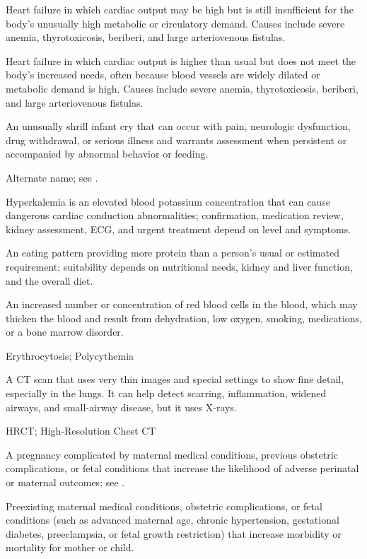  Heart failure in which cardiac output may be high but is still insufficient for the body's unusually high metabolic or circulatory demand. Causes include severe anemia, thyrotoxicosis, beriberi, and large arteriovenous fistulas.

 Heart failure in which cardiac output is higher than usual but does not meet the body's increased needs, often because blood vessels are widely dilated or metabolic demand is high. Causes include severe anemia, thyrotoxicosis, beriberi, and large arteriovenous fistulas.

 An unusually shrill infant cry that can occur with pain, neurologic dysfunction, drug withdrawal, or serious illness and warrants assessment when persistent or accompanied by abnormal behavior or feeding.

 Alternate name; see .

 Hyperkalemia is an elevated blood potassium concentration that can cause dangerous cardiac conduction abnormalities; confirmation, medication review, kidney assessment, ECG, and urgent treatment depend on level and symptoms.

 An eating pattern providing more protein than a person's usual or estimated requirement; suitability depends on nutritional needs, kidney and liver function, and the overall diet.

 An increased number or concentration of red blood cells in the blood, which may thicken the blood and result from dehydration, low oxygen, smoking, medications, or a bone marrow disorder.

\synonyms
Erythrocytosis; Polycythemia

 A CT scan that uses very thin images and special settings to show fine detail, especially in the lungs. It can help detect scarring, inflammation, widened airways, and small-airway disease, but it uses X-rays.

\synonyms
HRCT; High-Resolution Chest CT

 A pregnancy complicated by maternal medical conditions, previous obstetric complications, or fetal conditions that increase the likelihood of adverse perinatal or maternal outcomes; see .

 Preexisting maternal medical conditions, obstetric complications, or fetal conditions (such as advanced maternal age, chronic hypertension, gestational diabetes, preeclampsia, or fetal growth restriction) that increase morbidity or mortality for mother or child.

